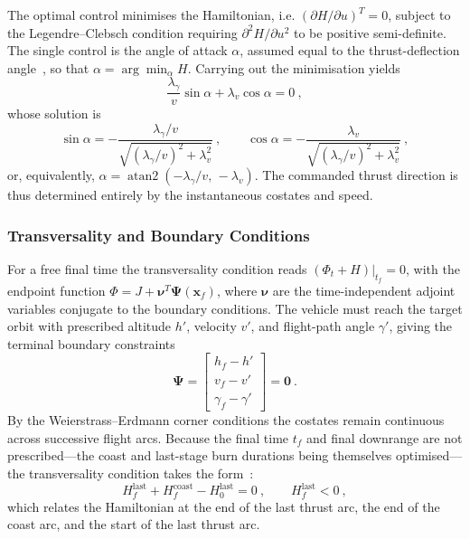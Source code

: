 The optimal control minimises the Hamiltonian, i.e. $(\partial H/\partial u)^{T}=0$, subject to the Legendre--Clebsch condition requiring $\partial^{2}H/\partial u^{2}$ to be positive semi-definite. The single control is the angle of attack $\alpha$, assumed equal to the thrust-deflection angle~\cite{pallone2016}, so that $\alpha = \arg\min_\alpha H$. Carrying out the minimisation yields
\begin{equation}
\frac{\lambda_\gamma}{v}\sin\alpha + \lambda_v\cos\alpha = 0 \ ,
\label{eq:indirect_control_implicit}
\end{equation}
whose solution is
\begin{equation}
\sin\alpha = -\frac{\lambda_\gamma/v}{\sqrt{\left(\lambda_\gamma/v\right)^{2} + \lambda_v^{2}}} \ ,
\qquad
\cos\alpha = -\frac{\lambda_v}{\sqrt{\left(\lambda_\gamma/v\right)^{2} + \lambda_v^{2}}} \ ,
\label{eq:indirect_control}
\end{equation}
or, equivalently, $\alpha = \operatorname{atan2}\!\left(-\lambda_\gamma/v,\,-\lambda_v\right)$. The commanded thrust direction is thus determined entirely by the instantaneous costates and speed.

\subsubsection{Transversality and Boundary Conditions}

For a free final time the transversality condition reads $(\Phi_t + H)|_{t_f}=0$, with the endpoint function $\Phi = J + \boldsymbol{\nu}^{T}\boldsymbol{\Psi}(\mathbf{x}_f)$, where $\boldsymbol{\nu}$ are the time-independent adjoint variables conjugate to the boundary conditions. The vehicle must reach the target orbit with prescribed altitude $h'$, velocity $v'$, and flight-path angle $\gamma'$, giving the terminal boundary constraints
\begin{equation}
\boldsymbol{\Psi} =
\begin{bmatrix} h_f - h' \\ v_f - v' \\ \gamma_f - \gamma' \end{bmatrix} = \mathbf{0} \ .
\label{eq:indirect_terminal}
\end{equation}
By the Weierstrass--Erdmann corner conditions the costates remain continuous across successive flight arcs. Because the final time $t_f$ and final downrange are not prescribed---the coast and last-stage burn durations being themselves optimised---the transversality condition takes the form~\cite{pontani2014particle}:
\begin{equation}
H_f^{\text{last}} + H_f^{\text{coast}} - H_0^{\text{last}} = 0 \ ,
\qquad H_f^{\text{last}} < 0 \ ,
\label{eq:indirect_transversality}
\end{equation}
which relates the Hamiltonian at the end of the last thrust arc, the end of the coast arc, and the start of the last thrust arc.


